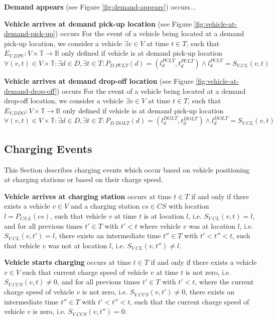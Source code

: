 \documentclass[graybox]{svmult}
\begin{document}
\noindent
\textbf{Demand appears} (see Figure \ref{fig:demand-appears}) occurs...

\vspace{4mm}

\noindent
\textbf{Vehicle arrives at demand pick-up location} (see Figure \ref{fig:vehicle-at-demand-pick-up}) 
occurs
For the event of a vehicle being located at a demand pick-up location, we consider a vehicle $\exists v \in V$ at time $t \in T$, such that 
$E_{V.DPU}: V \times \mathbb{T} \rightarrow \mathbb{B}$ only defined if vehicle is at demand pick-up location $\forall (v,t) \in V \times \mathbb{T}: \exists d \in D, \exists t \in T: P_{D.PULT}(d) = (l_d^{PULT},t_d^{PULT}) \wedge l_d^{PULT} = S_{V.CL}(v,t)$

\vspace{4mm}

\noindent
\textbf{Vehicle arrives at demand drop-off location} (see Figure \ref{fig:vehicle-at-demand-drop-off})
occurs
For the event of a vehicle being located at a demand drop-off location, we consider a vehicle $\exists v \in V$ at time $t \in T$, such that 
$E_{V.DDO}: V \times \mathbb{T} \rightarrow \mathbb{B}$ only defined if vehicle is at demand pick-up location $\forall (v,t) \in V \times \mathbb{T}: \exists d \in D, \exists t \in T: P_{D.DOLT}(d) = (l_d^{DOLT},t_d^{DOLT}) \wedge l_d^{DOLT} = S_{V.CL}(v,t)$

\vspace{4mm}


\subsection{Charging Events}
This Section describes charging events which occur based on vehicle positioning at charging stations or based on their charge speed.

\vspace{4mm}

\label{sec:charging-events}
\noindent
\textbf{Vehicle arrives at charging station}
occurs at time $t \in T$ if and only if there exists a vehicle $v \in V$ and a charging station $cs \in CS$ with location $l = P_{CS.L}(cs)$, such that vehicle $v$ at time $t$ is at location $l$, i.e. $S_{V.CL}(v, t) = l$, and for all previous times $t' \in T$ with $t' < t$ where vehicle $v$ was at location $l$, i.e. $S_{V.CL}(v, t') = l$, there exists an intermediate time $t'' \in T$ with $t' < t'' < t$, such that vehicle $v$ was not at location $l$, i.e. $S_{V.CL}(v, t'') \neq l$.

\vspace{4mm}
\noindent
\textbf{Vehicle starts charging}
occurs at time $t \in T$ if and only if there exists a vehicle $v \in V$ such that current charge speed of vehicle $v$ at time $t$ is not zero, i.e. $S_{V.CCS}(v,t) \neq 0$, and for all previous times $t' \in T$ with $t' < t$, where the current charge speed of vehicle $v$ is not zero, i.e. $S_{V.CCS}(v,t') \neq 0$, there exists an intermediate time $t'' \in T$ with $t' < t'' < t$, such that the current charge speed of vehicle $v$ is zero, i.e. $S_{V.CCS}(v,t'') = 0$.
\end{document}
